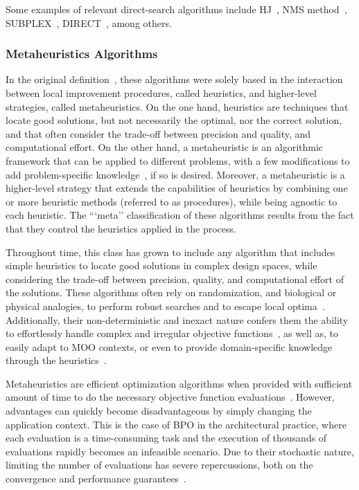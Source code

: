 	Some examples of relevant direct-search algorithms include \ac{HJ}~\cite{Hooke1961}, \ac{NMS} method~\cite{Nelder1964}, SUBPLEX~\cite{Rowan1990}, \ac{DIRECT}~\cite{Jones1993DIRECT}, among others.
	
	\subsubsection{Metaheuristics Algorithms}
	\label{ssec:metaheuristics}
	
	In the original definition~\cite{Glover2003Metaheuristics}, these algorithms were solely based in the interaction between local improvement procedures, called heuristics, and higher-level strategies, called metaheuristics. On the one hand, heuristics are techniques that locate good solutions, but not necessarily the optimal, nor the correct solution, and that often consider the trade-off between precision and quality, and computational effort. On the other hand, a metaheuristic is an algorithmic framework that can be applied to different problems, with a few modifications to add problem-specific knowledge~\cite{Glover2003Metaheuristics}, if so is desired. Moreover, a metaheuristic is a higher-level strategy that extends the capabilities of heuristics by combining one or more heuristic methods (referred to as procedures), while being agnostic to each heuristic. The ```meta'' classification of these algorithms results from the fact that they control the heuristics applied in the process.
	
	Throughout time, this class has grown to include any algorithm that includes simple heuristics to locate good solutions in complex design spaces, while considering the trade-off between precision, quality, and computational effort of the solutions. These algorithms often rely on randomization, and biological or physical analogies, to perform robust searches and to escape local optima~\cite{Glover2003Metaheuristics, Wortmann2016BBO}. Additionally, their non-deterministic and inexact nature confers them the ability to effortlessly handle complex and irregular objective functions~\cite{Wortmann2017GABESTCHOICE}, as well as, to easily adapt to \ac{MOO} contexts, or even to provide domain-specific knowledge through the heuristics~\cite{Wortmann2017GABESTCHOICE}.
	
	Metaheuristics are efficient optimization algorithms when provided with sufficient amount of time to do the necessary objective function evaluations~\cite{Conn2009}. However, advantages can quickly become disadvantageous by simply changing the application context. This is the case of \ac{BPO} in the architectural practice, where each evaluation is a time-consuming task and the execution of thousands of evaluations rapidly becomes an infeasible scenario. Due to their stochastic nature, limiting the number of evaluations has severe repercussions, both on the convergence and performance guarantees~\cite{Hasancebi2009}. 
	
